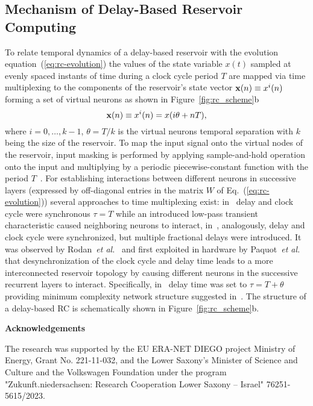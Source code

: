 \documentclass{WileyMSP-template}
\begin{document}
\subsection{Mechanism of Delay-Based Reservoir Computing}
To relate temporal dynamics of a delay-based reservoir with the evolution equation~(\ref{eq:rc-evolution}) the values of the state variable $x(t)$ sampled at evenly spaced instants of time during a clock cycle period $T$ are mapped via time multiplexing to the components of the reservoir's state vector $\vb{x}(n)\equiv x^i(n)$ forming a set of virtual neurons as shown in Figure~\ref{fig:rc_scheme}b
\begin{equation}
    \vb{x}(n)\equiv x^{i}(n)=x(i\theta+nT),
\label{eq:multiplexing}
\end{equation}
where $i=0,\ldots,k-1$, $\theta=T/k$ is the virtual neurons temporal separation with $k$ being the size of the reservoir.
To map the input signal onto the virtual nodes of the reservoir, input masking is performed by applying sample-and-hold operation onto the input and multiplying by a periodic piecewise-constant function with the period $T$~\cite{ref:appeltant2011,ref:brunner2018}.
For establishing interactions between different neurons in successive layers (expressed by off-diagonal entries in the matrix $W$ of Eq.~(\ref{eq:rc-evolution})) several approaches to time multiplexing exist: in~\cite{ref:larger2012} delay and clock cycle were synchronous $\tau=T$ while an introduced low-pass transient characteristic caused neighboring neurons to interact, in~\cite{ref:martinenghi2012}, analogously, delay and clock cycle were synchronized, but multiple fractional delays were introduced.
It was observed by Rodan~\emph{et al.}~\cite{ref:rodan2011} and first exploited in hardware by Paquot~\emph{et al.}~\cite{ref:paquot2012} that desynchronization of the clock cycle and delay time leads to a more interconnected reservoir topology by causing different neurons in the successive recurrent layers to interact. 
Specifically, in~\cite{ref:paquot2012,ref:antonik2017} delay time was set to $\tau=T+\theta$ providing minimum complexity network structure suggested in~\cite{ref:rodan2011}.
The structure of a delay-based RC is schematically shown in Figure~\ref{fig:rc_scheme}b.


\medskip
\textbf{Acknowledgements} \par 
The research was supported by the EU ERA-NET DIEGO project Ministry of Energy, Grant No. 221-11-032, and the Lower Saxony's Minister of Science and Culture and the Volkswagen Foundation under the program "Zukunft.niedersachsen: Research Cooperation Lower Saxony – Israel" 76251-5615/2023.
\end{document}

